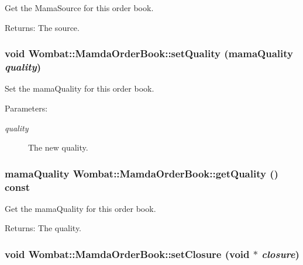 Get the Mama\-Source for this order book. 

\begin{Desc}
\item[Returns:]The source. \end{Desc}
\hypertarget{classWombat_1_1MamdaOrderBook_a3e9d873afa57abdbecba397fe3ace79}{
\subsubsection[setQuality]{\setlength{\rightskip}{0pt plus 5cm}void Wombat::Mamda\-Order\-Book::set\-Quality (mama\-Quality {\em quality})}}
\label{classWombat_1_1MamdaOrderBook_a3e9d873afa57abdbecba397fe3ace79}


Set the mama\-Quality for this order book. 

\begin{Desc}
\item[Parameters:]
\begin{description}
\item[{\em quality}]The new quality. \end{description}
\end{Desc}
\hypertarget{classWombat_1_1MamdaOrderBook_b4646b4abb66e91bcceaf93b61acb034}{
\subsubsection[getQuality]{\setlength{\rightskip}{0pt plus 5cm}mama\-Quality Wombat::Mamda\-Order\-Book::get\-Quality () const}}
\label{classWombat_1_1MamdaOrderBook_b4646b4abb66e91bcceaf93b61acb034}


Get the mama\-Quality for this order book. 

\begin{Desc}
\item[Returns:]The quality. \end{Desc}
\hypertarget{classWombat_1_1MamdaOrderBook_000519ebdbe9b646f1ef93227fd8927a}{
\subsubsection[setClosure]{\setlength{\rightskip}{0pt plus 5cm}void Wombat::Mamda\-Order\-Book::set\-Closure (void $\ast$ {\em closure})}}
\label{classWombat_1_1MamdaOrderBook_000519ebdbe9b646f1ef93227fd8927a}


